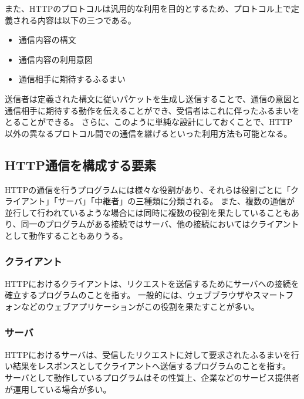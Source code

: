 \documentclass[12pt,a4paper]{jbook}
\begin{document}
また、HTTPのプロトコルは汎用的な利用を目的とするため、プロトコル上で定義される内容は以下の三つである。
\begin{itemize}
\item 通信内容の構文
\item 通信内容の利用意図
\item 通信相手に期待するふるまい
\end{itemize}
送信者は定義された構文に従いパケットを生成し送信することで、通信の意図と通信相手に期待する動作を伝えることができ、受信者はこれに伴ったふるまいをとることができる。
さらに、このように単純な設計にしておくことで、HTTP以外の異なるプロトコル間での通信を継げるといった利用方法も可能となる。

\subsection{HTTP通信を構成する要素}
HTTPの通信を行うプログラムには様々な役割があり、それらは役割ごとに「クライアント」「サーバ」「中継者」の三種類に分類される。
また、複数の通信が並行して行われているような場合には同時に複数の役割を果たしていることもあり、同一のプログラムがある接続ではサーバ、他の接続においてはクライアントとして動作することもありうる。

\subsubsection{クライアント}
HTTPにおけるクライアントは、リクエストを送信するためにサーバへの接続を確立するプログラムのことを指す。
一般的には、ウェブブラウザやスマートフォンなどのウェブアプリケーションがこの役割を果たすことが多い。

\subsubsection{サーバ}
HTTPにおけるサーバは、受信したリクエストに対して要求されたふるまいを行い結果をレスポンスとしてクライアントへ送信するプログラムのことを指す。
サーバとして動作しているプログラムはその性質上、企業などのサービス提供者が運用している場合が多い。
\end{document}

